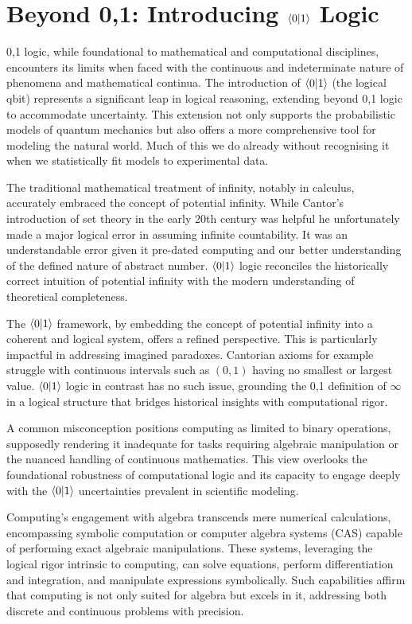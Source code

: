 \documentclass[12pt]{article}
\begin{document}
\section*{Beyond {0,1}: Introducing \(\langle 0 | 1 \rangle\) Logic}
 {0,1} logic, while foundational to mathematical and computational disciplines, encounters its limits when faced with the continuous and indeterminate nature of phenomena and mathematical continua. The introduction of \(\langle 0 | 1 \rangle\) (the logical qbit) represents a significant leap in logical reasoning, extending beyond {0,1} logic to accommodate uncertainty. This extension not only supports the probabilistic models of quantum mechanics but also offers a more comprehensive tool for modeling the natural world. Much of this we do already without recognising it when we statistically fit models to experimental data.

The traditional mathematical treatment of infinity, notably in calculus, accurately embraced the concept of potential infinity. While Cantor's introduction of set theory in the early 20th century was helpful he unfortunately made a major logical error in assuming infinite countability. It was an understandable error given it pre-dated computing and our better understanding of the defined nature of abstract number. \(\langle 0 | 1 \rangle\) logic reconciles the historically correct intuition of potential infinity with the modern understanding of theoretical completeness.

The \(\langle 0 | 1 \rangle\) framework, by embedding the concept of potential infinity into a coherent and logical system, offers a refined perspective. This is particularly impactful in addressing imagined paradoxes. Cantorian axioms for example struggle with continuous intervals such as \((0,1)\) having no smallest or largest value. \(\langle 0 | 1 \rangle\) logic in contrast has no such issue, grounding the {0,1} definition of \(\infty\) in a logical structure that bridges historical insights with computational rigor.

A common misconception positions computing as limited to binary operations, supposedly rendering it inadequate for tasks requiring algebraic manipulation or the nuanced handling of continuous mathematics. This view overlooks the foundational robustness of computational logic and its capacity to engage deeply with the \(\langle 0 | 1 \rangle\) uncertainties prevalent in scientific modeling.

Computing's engagement with algebra transcends mere numerical calculations, encompassing symbolic computation or computer algebra systems (CAS) capable of performing exact algebraic manipulations. These systems, leveraging the logical rigor intrinsic to computing, can solve equations, perform differentiation and integration, and manipulate expressions symbolically. Such capabilities affirm that computing is not only suited for algebra but excels in it, addressing both discrete and continuous problems with precision.
\end{document}
